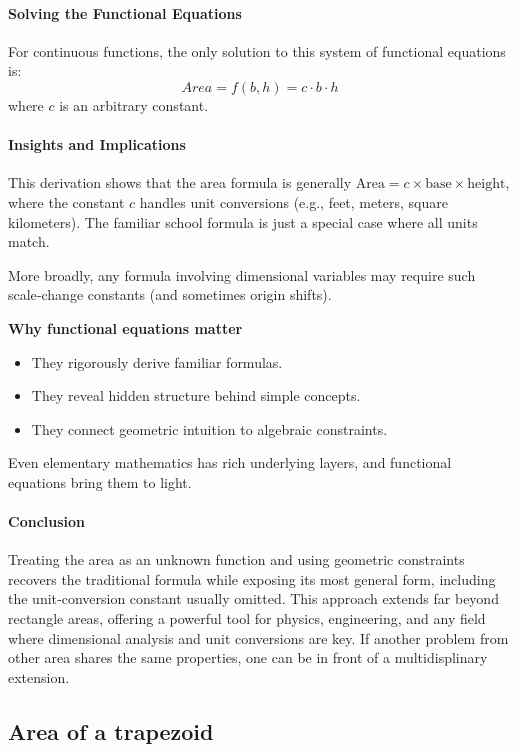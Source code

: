 \paragraph{Solving the Functional Equations}
For continuous functions, the only solution to this system of functional equations is:
\begin{equation}
\boxed{Area = f(b, h) = c \cdot b \cdot h}
\end{equation}
where $c$ is an arbitrary constant.

\paragraph{Insights and Implications}
This derivation shows that the area formula is generally \( \text{Area} = c \times \text{base} \times \text{height} \), where the constant \(c\) handles unit conversions (e.g., feet, meters, square kilometers). The familiar school formula is just a special case where all units match.

More broadly, any formula involving dimensional variables may require such scale‑change constants (and sometimes origin shifts).

\textbf{Why functional equations matter}
\begin{itemize}
    \item They rigorously derive familiar formulas.
    \item They reveal hidden structure behind simple concepts.
    \item They connect geometric intuition to algebraic constraints.
\end{itemize}
Even elementary mathematics has rich underlying layers, and functional equations bring them to light.

\paragraph{Conclusion}
Treating the area as an unknown function and using geometric constraints recovers the traditional formula while exposing its most general form, including the unit‑conversion constant usually omitted. This approach extends far beyond rectangle areas, offering a powerful tool for physics, engineering, and any field where dimensional analysis and unit conversions are key. If another problem from other area shares the same properties, one can be in front of a multidisplinary extension.

\subsection{Area of a trapezoid}

